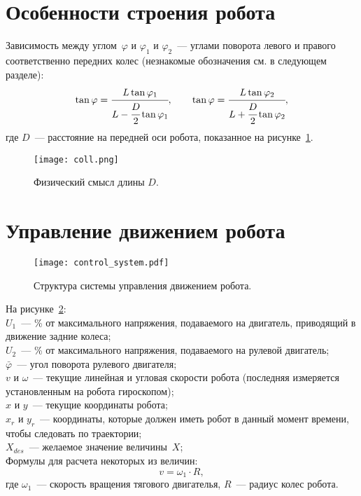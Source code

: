 \section{Особенности строения робота}
Зависимость между углом~$\varphi$ и $\varphi_1$ и $\varphi_2$~--- углами поворота левого и правого соответственно передних колес (незнакомые обозначения см. в следующем разделе):
\begin{equation}
    \tan\varphi = \cfrac{L \tan\varphi_1}{L - \cfrac{D}{2}\tan\varphi_1},
    \qquad
    \tan\varphi = \cfrac{L \tan\varphi_2}{L + \cfrac{D}{2}\tan\varphi_2},
\end{equation}
где $D$~--- расстояние на передней оси робота, показанное на рисунке~\ref{img_coll}.
\begin{figure}[h]
    \centering
    \texttt{[image: coll.png]}
    \caption{Физический смысл длины $D$.}
    \label{img_coll}
\end{figure}



\newpage
\section{Управление движением робота}
\begin{figure}[h]
    \centering
    \texttt{[image: control\_system.pdf]}
    \caption{Структура системы управления движением робота.}
    \label{img_control_system}
\end{figure}
На рисунке~\ref{img_control_system}:\\
$U_1$~--- \% от максимального напряжения, подаваемого на двигатель, приводящий в движение задние колеса;\\
$U_2$~--- \% от максимального напряжения, подаваемого на рулевой двигатель;\\
$\bar\varphi$~--- угол поворота рулевого двигателя;\\
$v$ и $\omega$~--- текущие линейная и угловая скорости робота (последняя измеряется установленным на робота гироскопом);\\
$x$ и $y$~--- текущие координаты робота;\\
$x_r$ и $y_r$~--- координаты, которые должен иметь робот в данный момент времени, чтобы следовать по траектории;\\
$X_{des}$~--- желаемое значение величины~$X$;\\

Формулы для расчета некоторых из величин:
\begin{equation}
    v = \omega_1 \cdot R,
\end{equation}
где $\omega_1$~--- скорость вращения тягового двигателья, $R$~--- радиус колес робота.

